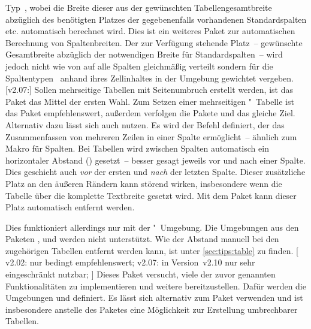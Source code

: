 \begin{DeclarePackages}
  Typ~, wobei die Breite dieser aus der gewünschten 
  Tabellengesamtbreite abzüglich des benötigten Platzes der gegebenenfalls 
  vorhandenen Standardspalten  etc. automatisch berechnet wird.
  Dies ist ein weiteres Paket zur automatischen Berechnung von Spaltenbreiten. 
  Der zur Verfügung stehende Platz~-- gewünschte Gesamtbreite abzüglich der 
  notwendigen Breite für Standardspalten~-- wird jedoch nicht wie von 
   auf alle Spalten gleichmäßig verteilt sondern für die 
  Spaltentypen~ anhand ihres Zellinhaltes in der Umgebung 
  gewichtet vergeben.
[v2.07:]
  Sollen mehrseitige Tabellen mit Seitenumbruch erstellt werden, ist das Paket
   das Mittel der ersten Wahl. Zum Setzen einer mehrseitigen 
  "~Tabelle ist das Paket  
  empfehlenswert, außerdem verfolgen die Pakete  und 
   das gleiche Ziel. Alternativ dazu lässt sich auch 
   nutzen.
  Es wird der Befehl  definiert, der das Zusammenfassen von 
  mehreren Zeilen in einer Spalte ermöglicht~-- ähnlich zum Makro 
   für Spalten.
  Bei Tabellen wird zwischen Spalten automatisch ein horizontaler Abstand 
  () gesetzt~-- besser gesagt jeweils vor und nach einer 
  Spalte. Dies geschieht auch \emph{vor} der ersten und \emph{nach} der letzten 
  Spalte. Dieser zusätzliche Platz an den äußeren Rändern kann störend wirken, 
  insbesondere wenn die Tabelle über die komplette Textbreite gesetzt wird. Mit 
  dem Paket  kann dieser Platz automatisch entfernt 
  werden.
  
  Dies funktioniert allerdings nur mit der "~Umgebung. 
  Die Umgebungen aus den Paketen ,  und 
   werden nicht unterstützt. Wie der Abstand manuell bei den 
  zugehörigen Tabellen entfernt werden kann, ist unter \autoref{sec:tips:table} 
  zu finden.
[%
    v2.02: nur bedingt empfehlenswert;
    v2.07: in Version~v2.10 nur sehr eingeschränkt nutzbar;
  ]%
  Dieses Paket versucht, viele der zuvor genannten Funktionalitäten zu 
  implementieren und weitere bereitzustellen. Dafür werden die Umgebungen 
   und  definiert. Es lässt sich 
  alternativ zum Paket  verwenden und ist insbesondere 
  anstelle des Paketes  eine Möglichkeit zur Erstellung 
  umbrechbarer Tabellen.
  

\end{DeclarePackages}

